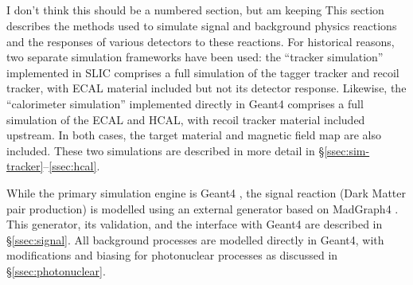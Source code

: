 
\subsection*{}
I don't think this should be a numbered section, but am keeping
This section describes the methods used to simulate signal and background physics reactions and the responses of various detectors to these reactions.  
For historical reasons, two separate simulation frameworks have been used: the ``tracker simulation'' implemented in SLIC comprises a full simulation of the tagger tracker and recoil tracker, with ECAL material included but not its detector response.  Likewise, the ``calorimeter simulation'' implemented directly in Geant4 comprises a full simulation of the ECAL and HCAL, with recoil tracker material included upstream. In both cases, the target material and magnetic field map are also included.  These two simulations are described in more detail in \S\ref{ssec:sim-tracker}--\ref{ssec:hcal}.

While the primary simulation engine is Geant4 \cite{g4}, the signal reaction (Dark Matter pair production) is modelled using an external generator based on MadGraph4 \cite{MG4}.  This generator, its validation, and the interface with Geant4 are described in \S\ref{ssec:signal}.  All background processes are modelled directly in Geant4, with modifications and biasing for photonuclear processes as discussed in \S\ref{ssec:photonuclear}.
